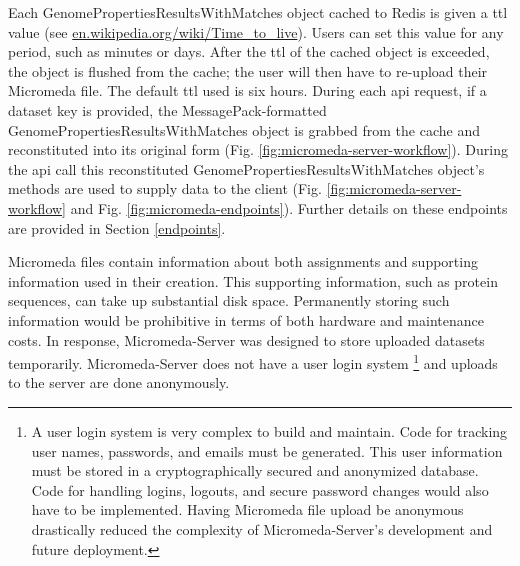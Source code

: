 Each GenomePropertiesResultsWithMatches object cached to Redis is given a 
\gls{ttl} value \cite{gwertzman1996world} (see 
\href{http://en.wikipedia.org/wiki/Time_to_live}{en.wikipedia.org/wiki/Time\_to\_live}). 
Users can set this value for any period, such as minutes or days. After the 
\gls{ttl} of the cached object is exceeded, the object is flushed from the cache; the 
user will then have to re-upload their Micromeda file. The default \gls{ttl} 
used is six hours. During each \gls{api} request, if a dataset key is provided, 
the MessagePack-formatted GenomePropertiesResultsWithMatches object is grabbed 
from the cache and reconstituted into its original form (Fig. 
\ref{fig:micromeda-server-workflow}). During the \gls{api} call this 
reconstituted GenomePropertiesResultsWithMatches object's methods are used to 
supply data to the client  (Fig. \ref{fig:micromeda-server-workflow} and Fig. 
\ref{fig:micromeda-endpoints}). Further details on these endpoints are provided 
in Section \ref{endpoints}.

Micromeda files contain information about both assignments and supporting 
information used in their creation. This supporting information, such as protein 
sequences, can take up substantial disk space. Permanently storing such 
information would be prohibitive in terms of both hardware and maintenance 
costs. In response, Micromeda-Server was designed to store uploaded datasets 
temporarily. Micromeda-Server does not have a user login system \footnote{A user 
login system is very complex to build and maintain. Code for tracking user 
names, passwords, and emails must be generated. This user information must be 
stored in a cryptographically secured and anonymized database. Code for handling 
logins, logouts, and secure password changes would also have to be implemented. 
Having Micromeda file upload be anonymous drastically reduced the complexity of 
Micromeda-Server's development and future deployment.} and uploads to the server 
are done anonymously.

